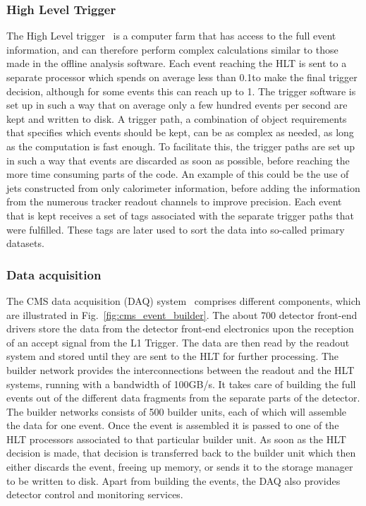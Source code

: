 \subsubsection{High Level Trigger \label{sec:cms_hlt}}

The High Level trigger~\cite{Adam:2005zf} is a computer farm that has access to the full event
information, and can therefore perform complex calculations similar to those made in the offline
analysis software. 
Each event reaching the HLT is sent to a separate processor which spends on average less than
0.1\second to make the final trigger decision, although for some events this can reach up to
1\second. 
The trigger software is set up in such a way that on average only a few hundred events per second
are kept and written to disk. 
A trigger path, a combination of object requirements that specifies which events should
be kept, can be as complex as needed, as long as the computation is fast enough. 
To facilitate this, the trigger paths are set up in such a way that events are discarded as soon as
possible, before reaching the more time consuming parts of the code. 
An example of this could be the use of jets constructed from only calorimeter information, before
adding the information from the numerous tracker readout channels to improve precision. 
Each event that is kept receives a set of tags associated with the separate trigger paths that were
fulfilled. These tags are later used to sort the data into so-called primary datasets. 


\subsubsection{Data acquisition \label{sec:cms_daq}}

The CMS data acquisition (DAQ) system~\cite{Cittolin:578006} comprises different components, which
are illustrated in Fig.~\ref{fig:cms_event_builder}. 
The about 700 detector front-end drivers store the data from the detector front-end electronics upon
the reception of an accept signal from the L1 Trigger. The data are then read by the readout system
and stored until they are sent to the HLT for further processing. 
The builder network provides the interconnections between the readout and the HLT systems, running
with a bandwidth of 100\unit{GB/s}. It takes care of building the full events out of the different
data fragments from the separate parts of the detector. The builder networks consists of 500 builder
units, each of which will assemble the data for one event. 
Once the event is assembled it is passed to one of the HLT processors associated to that particular
builder unit. As soon as the HLT decision is made, that decision is transferred back to the builder
unit which then either discards the event, freeing up memory, or sends it to the storage
manager to be written to disk.
Apart from building the events, the DAQ also provides detector control and monitoring services.

